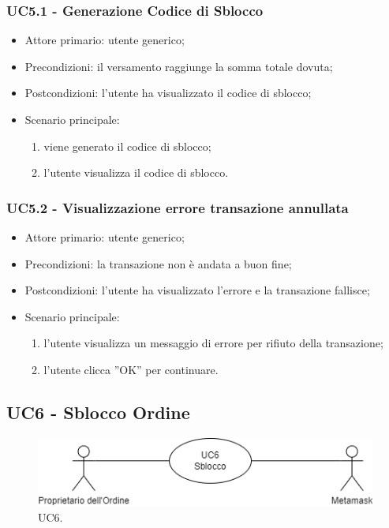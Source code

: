 \subsubsection{UC5.1 - Generazione Codice di Sblocco}

\begin{itemize}
    \item Attore primario: utente generico;
    \item Precondizioni: il versamento raggiunge la somma totale dovuta;
    \item Postcondizioni: l'utente ha visualizzato il codice di sblocco;
    \item Scenario principale:
    \begin{enumerate}
        \item viene generato il codice di sblocco;
        \item l'utente visualizza il codice di sblocco.
    \end{enumerate}
\end{itemize}

\subsubsection{UC5.2 - Visualizzazione errore transazione annullata}

\begin{itemize}
    \item Attore primario: utente generico;
    \item Precondizioni: la transazione non è andata a buon fine;
    \item Postcondizioni: l'utente ha visualizzato l'errore e la transazione fallisce;
    \item Scenario principale:
    \begin{enumerate}
        \item l'utente visualizza un messaggio di errore per rifiuto della transazione;
        \item l'utente clicca ”OK” per continuare.
    \end{enumerate}
\end{itemize}

\subsection{UC6 - Sblocco Ordine}

\begin{figure}[H]
    \centering
    \includegraphics[scale=0.7]{immagini/UseCases-UC6.png}
    \caption{UC6.}
  \end{figure}

